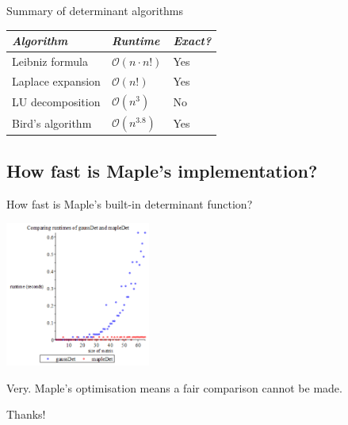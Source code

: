 \documentclass{beamer}
\begin{document}
\begin{frame}{Summary of determinant algorithms}

    \begin{center}
        \begin{tabular}{l l l}
            \toprule
            \emph{Algorithm}     & \emph{Runtime}           & \emph{Exact?} \\
            \midrule
            Leibniz formula      & $\mathcal{O}(n\cdot n!)$    & Yes \\
            Laplace expansion    & $\mathcal{O}(n!)$        & Yes \\
            LU decomposition     & $\mathcal{O}(n^3)$       & No \\
            Bird's algorithm     & $\mathcal{O}(n^{3.8})$   & Yes \\
            \bottomrule
        \end{tabular}
    \end{center}

\end{frame}

\subsection{How fast is Maple's implementation?}

\begin{frame}{How fast is Maple's built-in determinant function?}

    \begin{center}{}
        \includegraphics[height=180]{gauss-maple}
    \end{center}
    Very. Maple's optimisation means a fair comparison cannot be made.

\end{frame}

\begin{frame}

    \begin{center}
        \Huge{Thanks!}
    \end{center}

\end{frame}
\end{document}
